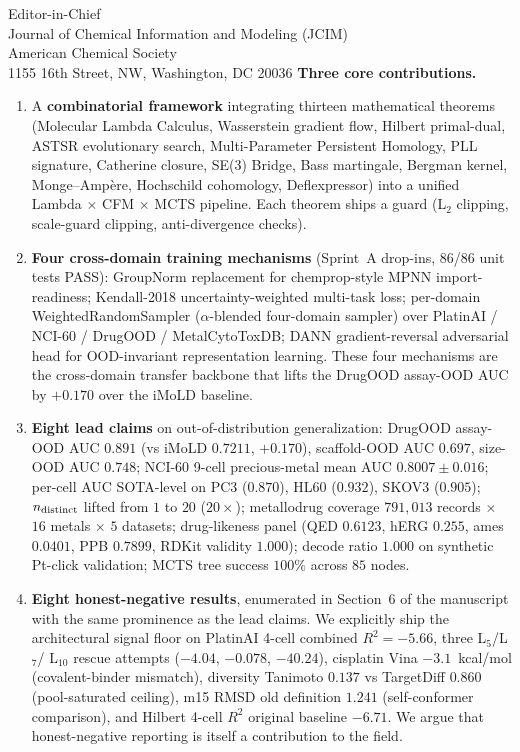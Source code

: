 \documentclass[11pt]{letter}
\begin{document}
\begin{letter}{Editor-in-Chief \\
  Journal of Chemical Information and Modeling (JCIM) \\
  American Chemical Society \\
  1155 16th Street, NW, Washington, DC 20036}
\noindent\textbf{Three core contributions.}
\begin{enumerate}
  \item A \textbf{combinatorial framework} integrating thirteen mathematical
        theorems (Molecular Lambda Calculus, Wasserstein gradient flow,
        Hilbert primal-dual, ASTSR evolutionary search, Multi-Parameter
        Persistent Homology, PLL signature, Catherine closure, SE(3)
        Bridge, Bass martingale, Bergman kernel, Monge--Amp\`ere, Hochschild
        cohomology, Deflexpressor) into a unified Lambda $\times$ CFM
        $\times$ MCTS pipeline.  Each theorem ships a guard (L$_2$
        clipping, scale-guard clipping, anti-divergence checks).
  \item \textbf{Four cross-domain training mechanisms} (Sprint~A
        drop-ins, 86/86 unit tests PASS): GroupNorm replacement for
        chemprop-style MPNN import-readiness; Kendall-2018
        uncertainty-weighted multi-task loss; per-domain
        WeightedRandomSampler ($\alpha$-blended four-domain sampler)
        over PlatinAI / NCI-60 / DrugOOD / MetalCytoToxDB; DANN
        gradient-reversal adversarial head for OOD-invariant
        representation learning.  These four mechanisms are the
        cross-domain transfer backbone that lifts the DrugOOD assay-OOD
        AUC by $+0.170$ over the iMoLD baseline.
  \item \textbf{Eight lead claims} on out-of-distribution generalization:
        DrugOOD assay-OOD AUC $0.891$ (vs iMoLD $0.7211$, $+0.170$),
        scaffold-OOD AUC $0.697$, size-OOD AUC $0.748$; NCI-60 9-cell
        precious-metal mean AUC $0.8007 \pm 0.016$; per-cell AUC SOTA-level
        on PC3 ($0.870$), HL60 ($0.932$), SKOV3 ($0.905$); $n_{\rm
        distinct}$ lifted from $1$ to $20$ ($20\times$); metallodrug
        coverage $791{,}013$ records $\times$ $16$ metals $\times$
        $5$ datasets; drug-likeness panel (QED $0.6123$, hERG $0.255$,
        ames $0.0401$, PPB $0.7899$, RDKit validity $1.000$); decode
        ratio $1.000$ on synthetic Pt-click validation; MCTS tree
        success $100\%$ across $85$ nodes.
  \item \textbf{Eight honest-negative results}, enumerated in
        Section~6 of the manuscript with the same prominence as the
        lead claims.  We explicitly ship the architectural signal floor
        on PlatinAI 4-cell combined $R^2 = -5.66$, three L$_5$/L$_7$/
        L$_{10}$ rescue attempts ($-4.04$, $-0.078$, $-40.24$),
        cisplatin Vina $-3.1$~kcal/mol (covalent-binder mismatch),
        diversity Tanimoto $0.137$ vs TargetDiff $0.860$ (pool-saturated
        ceiling), m15 RMSD old definition $1.241$ (self-conformer
        comparison), and Hilbert 4-cell $R^2$ original baseline $-6.71$.
        We argue that honest-negative reporting is itself a contribution
        to the field.
\end{enumerate}


\end{letter}
\end{document}
